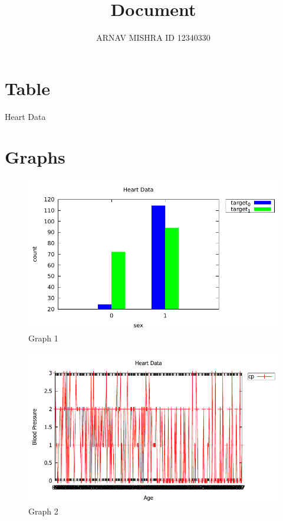 \documentclass{article}
\title{Document}
\author{ARNAV MISHRA ID 12340330}
\begin{document}
\maketitle

\section{Table}
\begin{table}[h!]
\centering
\caption{Heart Data}
\end{table}

\FloatBarrier

\section{Graphs}
\begin{figure}[h]
\includegraphics[width=\textwidth]{./q4a.pdf}
\caption{\label{graph_1} Graph 1}
\end{figure}

\begin{figure}[h]
\includegraphics[width=\textwidth]{./q4b.pdf}
\caption{\label{graph_2} Graph 2}
\end{figure}
\end{document}
